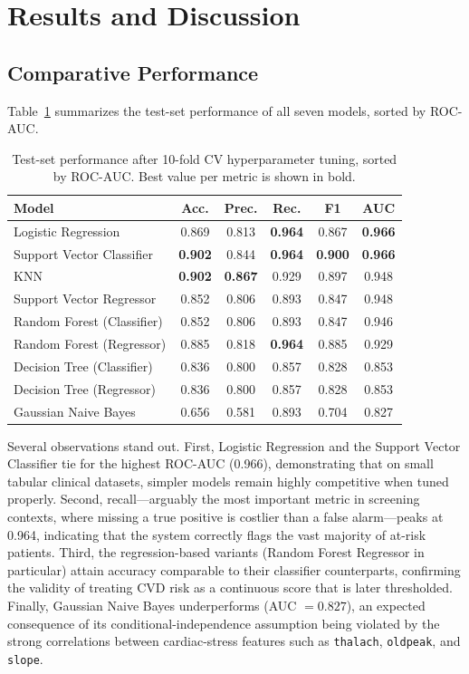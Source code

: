 \documentclass[conference]{IEEEtran}
\begin{document}
\section{Results and Discussion}\label{sec:results}

\subsection{Comparative Performance}
Table~\ref{tab:results} summarizes the test-set performance of all seven models, sorted by ROC-AUC.

\begin{table}[h]
\centering
\caption{Test-set performance after 10-fold CV hyperparameter tuning, sorted by ROC-AUC. Best value per metric is shown in bold.}
\label{tab:results}
\renewcommand{\arraystretch}{1.15}
\begin{tabular}{lccccc}
\toprule
\textbf{Model} & \textbf{Acc.} & \textbf{Prec.} & \textbf{Rec.} & \textbf{F1} & \textbf{AUC} \\
\midrule
Logistic Regression & 0.869 & 0.813 & \textbf{0.964} & 0.867 & \textbf{0.966} \\
Support Vector Classifier & \textbf{0.902} & 0.844 & \textbf{0.964} & \textbf{0.900} & \textbf{0.966} \\
KNN & \textbf{0.902} & \textbf{0.867} & 0.929 & 0.897 & 0.948 \\
Support Vector Regressor & 0.852 & 0.806 & 0.893 & 0.847 & 0.948 \\
Random Forest (Classifier) & 0.852 & 0.806 & 0.893 & 0.847 & 0.946 \\
Random Forest (Regressor) & 0.885 & 0.818 & \textbf{0.964} & 0.885 & 0.929 \\
Decision Tree (Classifier) & 0.836 & 0.800 & 0.857 & 0.828 & 0.853 \\
Decision Tree (Regressor) & 0.836 & 0.800 & 0.857 & 0.828 & 0.853 \\
Gaussian Naive Bayes & 0.656 & 0.581 & 0.893 & 0.704 & 0.827 \\
\bottomrule
\end{tabular}
\end{table}

Several observations stand out. First, Logistic Regression and the Support Vector Classifier tie for the highest ROC-AUC (0.966), demonstrating that on small tabular clinical datasets, simpler models remain highly competitive when tuned properly. Second, recall---arguably the most important metric in screening contexts, where missing a true positive is costlier than a false alarm---peaks at 0.964, indicating that the system correctly flags the vast majority of at-risk patients. Third, the regression-based variants (Random Forest Regressor in particular) attain accuracy comparable to their classifier counterparts, confirming the validity of treating CVD risk as a continuous score that is later thresholded. Finally, Gaussian Naive Bayes underperforms (AUC $= 0.827$), an expected consequence of its conditional-independence assumption being violated by the strong correlations between cardiac-stress features such as \texttt{thalach}, \texttt{oldpeak}, and \texttt{slope}.
\end{document}
